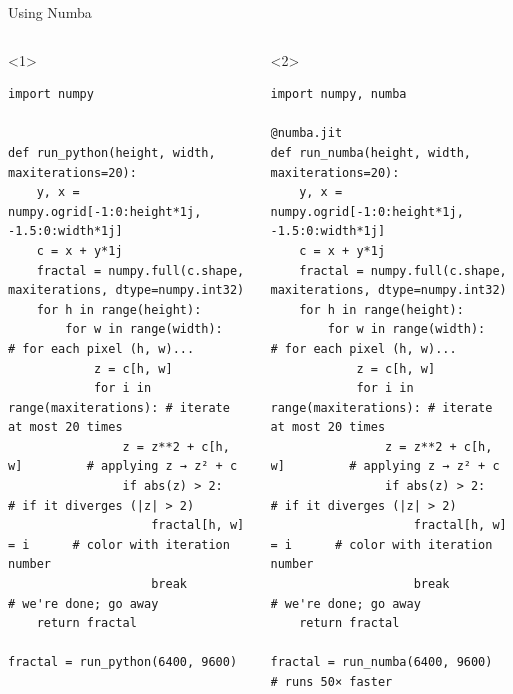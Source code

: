 \documentclass[aspectratio=169]{beamer}
\begin{document}
\begin{frame}[fragile]{Using Numba}
\begin{columns}
\small
\begin{onlyenv}<1>
\begin{verbatim}
import numpy


def run_python(height, width, maxiterations=20):
    y, x = numpy.ogrid[-1:0:height*1j, -1.5:0:width*1j]
    c = x + y*1j
    fractal = numpy.full(c.shape, maxiterations, dtype=numpy.int32)
    for h in range(height):
        for w in range(width):             # for each pixel (h, w)...
            z = c[h, w]
            for i in range(maxiterations): # iterate at most 20 times
                z = z**2 + c[h, w]         # applying z → z² + c
                if abs(z) > 2:             # if it diverges (|z| > 2)
                    fractal[h, w] = i      # color with iteration number
                    break                  # we're done; go away
    return fractal

fractal = run_python(6400, 9600)
\end{verbatim}
\end{onlyenv}
\begin{onlyenv}<2>
\begin{verbatim}
import numpy, numba

@numba.jit
def run_numba(height, width, maxiterations=20):
    y, x = numpy.ogrid[-1:0:height*1j, -1.5:0:width*1j]
    c = x + y*1j
    fractal = numpy.full(c.shape, maxiterations, dtype=numpy.int32)
    for h in range(height):
        for w in range(width):             # for each pixel (h, w)...
            z = c[h, w]
            for i in range(maxiterations): # iterate at most 20 times
                z = z**2 + c[h, w]         # applying z → z² + c
                if abs(z) > 2:             # if it diverges (|z| > 2)
                    fractal[h, w] = i      # color with iteration number
                    break                  # we're done; go away
    return fractal

fractal = run_numba(6400, 9600)            # runs 50× faster
\end{verbatim}
\end{onlyenv}
\end{columns}
\end{frame}
\end{document}
